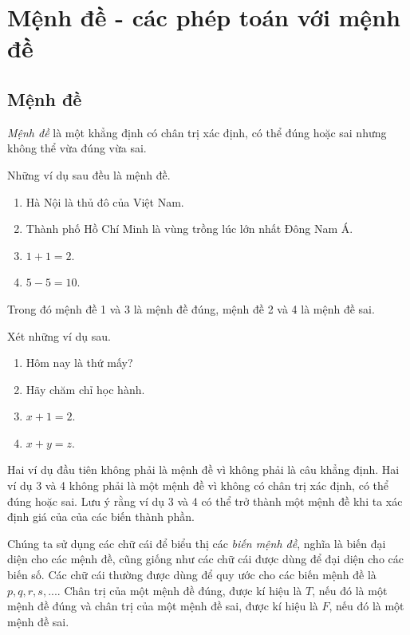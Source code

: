 \documentclass{standalone} %
\begin{document}
    \section{Mệnh đề - các phép toán với mệnh đề}
    \subsection{Mệnh đề}
    \begin{definition} 
        \emph{Mệnh đề} là một khẳng định có chân trị xác định, có thể đúng hoặc sai nhưng không thể vừa đúng vừa sai.
    \end{definition}
        \begin{example}
            Những ví dụ sau đều là mệnh đề.
            \begin{enumerate}
                \item Hà Nội là thủ đô của Việt Nam.
                \item Thành phố Hồ Chí Minh là vùng trồng lúc lớn nhất Đông Nam Á.
                \item $1 + 1 = 2$.
                \item $5 - 5 = 10$.
            \end{enumerate}
        \end{example}
        Trong đó mệnh đề 1 và 3 là mệnh đề đúng, mệnh đề 2 và 4 là mệnh đề sai.\\
        \begin{example}
            Xét những ví dụ sau.
            \begin{enumerate}
                \item Hôm nay là thứ mấy?
                \item Hãy chăm chỉ học hành.
                \item $x + 1 = 2$.
                \item $x + y = z$.
            \end{enumerate}
        \end{example}

        Hai ví dụ đầu tiên không phải là mệnh đề vì không phải là câu khẳng định. Hai ví dụ 3 và 4 không phải là một mệnh đề vì không có chân trị xác
        định, có thể đúng hoặc sai. Lưu ý rằng ví dụ 3 và 4 có thể trở thành một mệnh đề khi ta xác định giá của của các biến thành phần.

        Chúng ta sử dụng các chữ cái để biểu thị các \emph{biến mệnh đề}, nghĩa là biến đại diện cho các mệnh đề, cũng giống như các chữ cái được dùng
        để đại diện cho các biến số. Các chữ cái thường được dùng để quy ước cho các biến mệnh đề là $p, q, r, s, ...$. Chân trị của một mệnh đề đúng, được kí hiệu là
        $T$, nếu đó là một mệnh đề đúng và chân trị của một mệnh đề sai, được kí hiệu là $F$, nếu đó là một mệnh đề sai.
\end{document}
